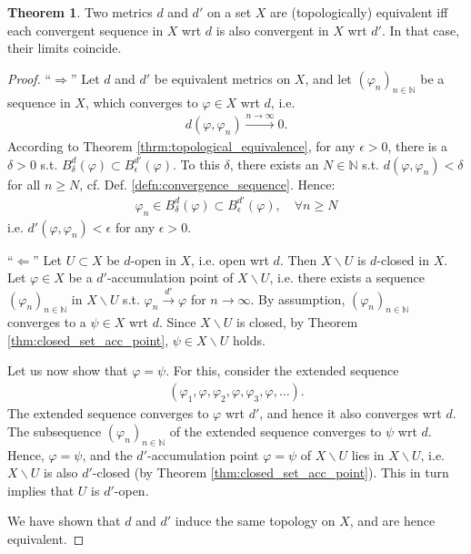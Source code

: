 \documentclass[12pt, a4paper]{article}
\numberwithin{equation}{section}
\theoremstyle{definition}
\theoremstyle{definition}
\newtheorem{theorem}[thm]{Theorem}
\begin{document}
		\begin{theorem}
			Two metrics $d$ and $d'$ on a set $X$ are (topologically) equivalent iff each convergent sequence in $X$ wrt $d$ is also convergent in $X$ wrt $d'$. In that case, their limits coincide.
		\end{theorem}
		
		\begin{proof}
			\enquote{$\Longrightarrow$} Let $d$ and $d'$ be equivalent metrics on $X$, and let $(\varphi_n)_{n\in\mathbb N}$ be a sequence in $X$, which converges to $\varphi\in X$ wrt $d$, i.e.
			\begin{align}
				d(\varphi, \varphi_n) \overset{n\to\infty}{\longrightarrow} 0.
			\end{align}
			According to Theorem \ref{thrm:topological_equivalence}, for any $\epsilon > 0$, there is a $\delta > 0$ s.t. $B_{\delta}^{d}(\varphi) \subset B_{\epsilon}^{d'}(\varphi)$. To this $\delta$, there exists an $N\in\mathbb N$ s.t. $d(\varphi, \varphi_n) < \delta$ for all $n\geq N$, cf. Def. \ref{defn:convergence_sequence}. Hence:
			\begin{align}
				\varphi_n\in B^{d}_{\delta}(\varphi) \subset B^{d'}_{\epsilon}(\varphi), \quad \forall n\geq N
			\end{align}
			i.e. $d'(\varphi, \varphi_n) < \epsilon$ for any $\epsilon > 0$.
			
			\enquote{$\Longleftarrow$} Let $U\subset X$ be $d$-open in $X$, i.e. open wrt $d$. Then $X\backslash U$ is $d$-closed in $X$. Let $\varphi\in X$ be a $d'$-accumulation point of $X\backslash U$, i.e. there exists a sequence $(\varphi_n)_{n\in\mathbb N}$ in $X\backslash U$ s.t. $\varphi_n \overset{d'}{\longrightarrow} \varphi$ for $n\to\infty$. By assumption, $(\varphi_n)_{n\in\mathbb N}$ converges to a $\psi\in X$ wrt $d$. Since $X\backslash U$ is closed, by Theorem \ref{thm:closed_set_acc_point}, $\psi\in X\backslash U$ holds. 
			
			Let us now show that $\varphi = \psi$. For this, consider the extended sequence 
			\begin{align}
				\left(\varphi_1, \varphi, \varphi_2, \varphi, \varphi_3, \varphi, \dots\right).
			\end{align}
			The extended sequence converges to $\varphi$ wrt $d'$, and hence it also converges wrt $d$. The subsequence $(\varphi_n)_{n\in\mathbb N}$ of the extended sequence converges to $\psi$ wrt $d$. Hence, $\varphi = \psi$, and the $d'$-accumulation point $\varphi=\psi$ of $X\backslash U$ lies in $X\backslash U$, i.e. $X\backslash U$ is also $d'$-closed (by Theorem \ref{thm:closed_set_acc_point}). This in turn implies that $U$ is $d'$-open.
			
			We have shown that $d$ and $d'$ induce the same topology on $X$, and are hence equivalent.
		\end{proof}
	
\end{document}
